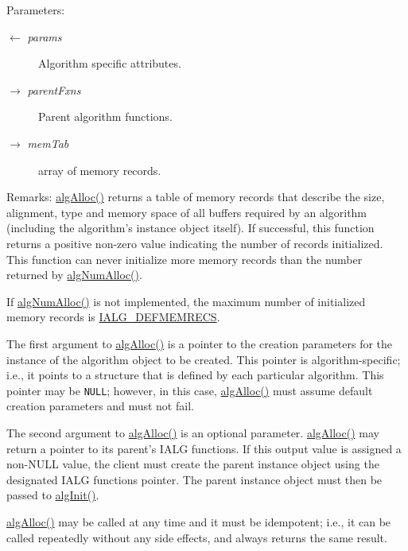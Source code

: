 \begin{Desc}
\item[Parameters:]
\begin{description}
\item[\mbox{$\leftarrow$} {\em params}]Algorithm specific attributes. \item[\mbox{$\rightarrow$} {\em parent\-Fxns}]Parent algorithm functions. \item[\mbox{$\rightarrow$} {\em mem\-Tab}]array of memory records.\end{description}
\end{Desc}
\begin{Desc}
\item[Remarks:]\hyperlink{struct_i_a_l_g___fxns_1640ba8f4033af1ce3887283c7a12746}{alg\-Alloc()} returns a table of memory records that describe the size, alignment, type and memory space of all buffers required by an algorithm (including the algorithm's instance object itself). If successful, this function returns a positive non-zero value indicating the number of records initialized. This function can never initialize more memory records than the number returned by \hyperlink{struct_i_a_l_g___fxns_098c1ca275465bb4acc1d3d0cf060160}{alg\-Num\-Alloc()}.

If \hyperlink{struct_i_a_l_g___fxns_098c1ca275465bb4acc1d3d0cf060160}{alg\-Num\-Alloc()} is not implemented, the maximum number of initialized memory records is \hyperlink{group__ti__xdais___i_a_l_g_g8a220fa863380937542f6a38be47ceda}{IALG\_\-DEFMEMRECS}.

The first argument to \hyperlink{struct_i_a_l_g___fxns_1640ba8f4033af1ce3887283c7a12746}{alg\-Alloc()} is a pointer to the creation parameters for the instance of the algorithm object to be created. This pointer is algorithm-specific; i.e., it points to a structure that is defined by each particular algorithm. This pointer may be {\tt NULL}; however, in this case, \hyperlink{struct_i_a_l_g___fxns_1640ba8f4033af1ce3887283c7a12746}{alg\-Alloc()} must assume default creation parameters and must not fail.

The second argument to \hyperlink{struct_i_a_l_g___fxns_1640ba8f4033af1ce3887283c7a12746}{alg\-Alloc()} is an optional parameter. \hyperlink{struct_i_a_l_g___fxns_1640ba8f4033af1ce3887283c7a12746}{alg\-Alloc()} may return a pointer to its parent's IALG functions. If this output value is assigned a non-NULL value, the client must create the parent instance object using the designated IALG functions pointer. The parent instance object must then be passed to \hyperlink{struct_i_a_l_g___fxns_94eca7c58cceb112eccd970a6cf3f569}{alg\-Init()}.

\hyperlink{struct_i_a_l_g___fxns_1640ba8f4033af1ce3887283c7a12746}{alg\-Alloc()} may be called at any time and it must be idempotent; i.e., it can be called repeatedly without any side effects, and always returns the same result.\end{Desc}
